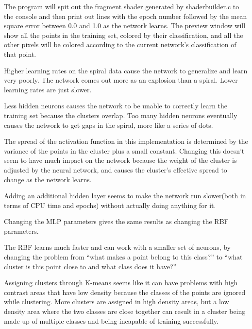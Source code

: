 \documentclass[11pt]{article}
\begin{document}
The program will spit out the fragment shader generated by shaderbuilder.c to the console and then print out lines with the epoch number followed by the mean square error between 0.0 and 1.0 as the network learns. The preview window will show all the points in the training set, colored by their classification, and all the other pixels will be colored according to the current network's classification of that point.

Higher learning rates on the spiral data cause the network to generalize and learn very poorly. The network comes out more as an explosion than a spiral. Lower learning rates are just slower.

Less hidden neurons causes the network to be unable to correctly learn the training set because the clusters overlap. Too many hidden neurons eventually causes the network to get gaps in the spiral, more like a series of dots.

The spread of the activation function in this implementation is determined by the variance of the points in the cluster plus a small constant. Changing this doesn't seem to have much impact on the network because the weight of the cluster is adjusted by the neural network, and causes the cluster's effective spread to change as the network learns.

Adding an additional hidden layer seems to make the network run slower(both in terms of CPU time and epochs) without actually doing anything for it.

Changing the MLP parameters gives the same results as changing the RBF parameters.

The RBF learns much faster and can work with a smaller set of neurons, by changing the problem from ``what makes a point belong to this class?'' to ``what cluster is this point close to and what class does it have?''

Assigning clusters through K-means seems like it can have problems with high contrast areas that have low density because the classes of the points are ignored while clustering. More clusters are assigned in high density areas, but a low density area where the two classes are close together can result in a cluster being made up of multiple classes and being incapable of training successfully.
\end{document}
